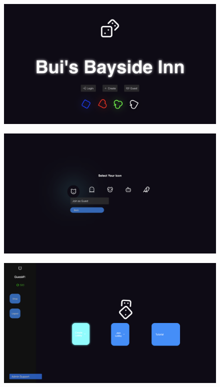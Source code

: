 \begin{figure}[h!]
\centering
\includegraphics[width=1\linewidth]{UI Screenshot 1.png}
\label{fig:ui1}
\end{figure}

\begin{figure}[h!]
\centering
\includegraphics[width=1\linewidth]{UI Screenshot 2.png}
\label{fig:ui2}
\end{figure}

\begin{figure}[h!]
\centering
\includegraphics[width=1\linewidth]{UI Screenshot 3.png}
\label{fig:ui3}
\end{figure}

